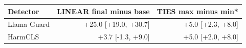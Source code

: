 \begin{tabular}{lrr}
\toprule
Detector & LINEAR final minus base & TIES max minus min* \\
\midrule
Llama Guard & +25.0 [+19.0, +30.7] & +5.0 [+2.3, +8.0] \\
HarmCLS & +3.7 [-1.3, +9.0] & +5.0 [+2.0, +8.0] \\
\bottomrule
\end{tabular}
